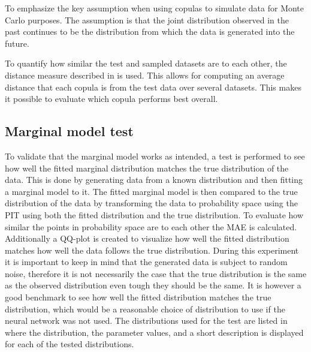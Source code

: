 To emphasize the key assumption when using copulas to simulate data for Monte Carlo purposes. The assumption is that the joint distribution observed in the past continues to be the distribution from which the data is generated into the future. 

To quantify how similar the test and sampled datasets are to each other, the distance measure described in  is used. This allows for computing an average distance that each copula is from the test data over several datasets. This makes it possible to evaluate which copula performs best overall.  


\subsection{Marginal model test}
To validate that the marginal model works as intended, a test is performed to see how well the fitted marginal distribution matches the true distribution of the data. This is done by generating data from a known distribution and then fitting a marginal model to it. The fitted marginal model is then compared to the true distribution of the data by transforming the data to probability space using the \gls{PIT} using both the fitted distribution and the true distribution. To evaluate how similar the points in probability space are to each other the \gls{MAE} is calculated. Additionally a QQ-plot is created to visualize how well the fitted distribution matches how well the data follows the true distribution. During this experiment it is important to keep in mind that the generated data is subject to random noise, therefore it is not necessarily the case that the true distribution is the same as the observed distribution even tough they should be the same. It is however a good benchmark to see how well the fitted distribution matches the true distribution, which would be a reasonable choice of distribution to use if the neural network was not used. The distributions used for the test are listed in  where the distribution, the parameter values, and a short description is displayed for each of the tested distributions.


